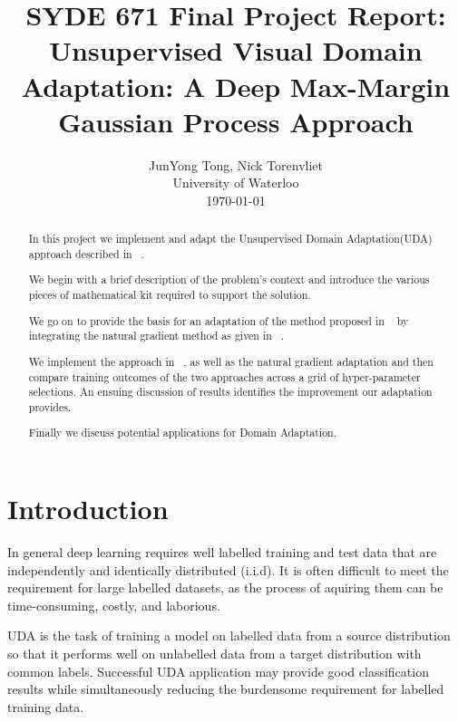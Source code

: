 \documentclass[10pt,twocolumn,letterpaper]{article}
\begin{document}
\title{SYDE 671 Final Project Report:\\
Unsupervised Visual Domain Adaptation: A Deep Max-Margin Gaussian Process Approach}

\author{JunYong Tong, Nick Torenvliet\\
University of Waterloo\\
\today
}

\maketitle

\begin{abstract}
In this project we implement and adapt the Unsupervised Domain Adaptation(UDA) approach described in ~\cite{kim2019unsupervised}.

We begin with a brief description of the problem's context and introduce the various pieces of mathematical kit required to support the solution.  

We go on to provide the basis for an adaptation of the method proposed in ~\cite{kim2019unsupervised} by integrating the natural gradient method as given in ~\cite{khan2018fast}.  

We implement the approach in ~\cite{kim2019unsupervised}, as well as the natural gradient adaptation and then compare training outcomes of the two approaches across a grid of hyper-parameter selections.  An ensuing discussion of results identifies the improvement our adaptation provides.

Finally we discuss potential applications for Domain Adaptation.
\end{abstract}

\section{Introduction}
In general deep learning requires well labelled training and test data that are independently and identically distributed (i.i.d). It is often difficult to meet the requirement for large labelled datasets, as the process of aquiring them can be time-consuming, costly, and laborious.   

UDA is the task of training a model on labelled data from a source distribution so that it performs well on unlabelled data from a target distribution with common labels.  Successful UDA application may provide good classification results while simultaneously reducing the burdensome requirement for labelled training data. 
\end{document}
